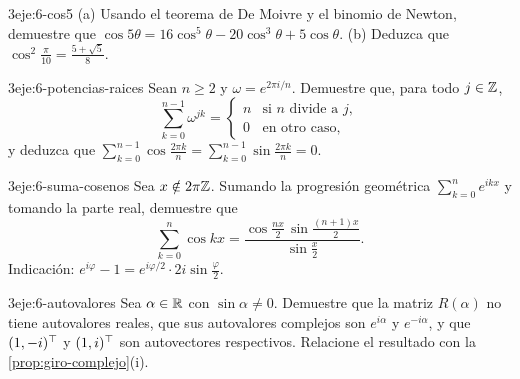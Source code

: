 \begin{ejercicio}{3}{eje:6-cos5}
(a) Usando el teorema de De Moivre y el binomio de Newton, demuestre que $\cos5\theta=16\cos^{5}\theta-20\cos^{3}\theta+5\cos\theta$. (b) Deduzca que $\cos^{2}\frac{\pi}{10}=\frac{5+\sqrt5}{8}$.
\end{ejercicio}

\begin{ejercicio}{3}{eje:6-potencias-raices}
Sean $n\ge2$ y $\omega=e^{2\pi i/n}$. Demuestre que, para todo $j\in\mathbb{Z}$,
\[
\sum_{k=0}^{n-1}\omega^{jk}=\begin{cases}n&\text{si $n$ divide a $j$},\\ 0&\text{en otro caso},\end{cases}
\]
y deduzca que $\sum_{k=0}^{n-1}\cos\frac{2\pi k}{n}=\sum_{k=0}^{n-1}\sin\frac{2\pi k}{n}=0$.
\end{ejercicio}

\begin{ejercicio}{3}{eje:6-suma-cosenos}
Sea $x\notin2\pi\mathbb{Z}$. Sumando la progresión geométrica $\sum_{k=0}^{n}e^{ikx}$ y tomando la parte real, demuestre que
\[
\sum_{k=0}^{n}\cos kx=\frac{\cos\frac{nx}{2}\,\sin\frac{(n+1)x}{2}}{\sin\frac{x}{2}} .
\]
Indicación: $e^{i\varphi}-1=e^{i\varphi/2}\cdot 2i\sin\frac{\varphi}{2}$.
\end{ejercicio}

\begin{ejercicio}{3}{eje:6-autovalores}
Sea $\alpha\in\mathbb{R}$ con $\sin\alpha\ne0$. Demuestre que la matriz $R(\alpha)$ no tiene autovalores reales, que sus autovalores complejos son $e^{i\alpha}$ y $e^{-i\alpha}$, y que $(1,-i)^{\top}$ y $(1,i)^{\top}$ son autovectores respectivos. Relacione el resultado con la \cref{prop:giro-complejo}(i).
\end{ejercicio}

